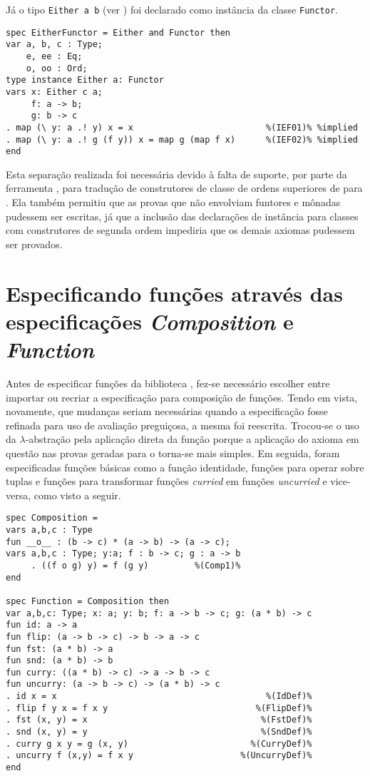 Já o tipo \Verb.Either a b. (ver ) foi declarado como instância da classe \Verb.Functor..

\begin{Verbatim}
spec EitherFunctor = Either and Functor then
var a, b, c : Type;
    e, ee : Eq;
    o, oo : Ord;
type instance Either a: Functor
vars x: Either c a;  
     f: a -> b;
     g: b -> c
. map (\ y: a .! y) x = x                          %(IEF01)% %implied
. map (\ y: a .! g (f y)) x = map g (map f x)      %(IEF02)% %implied
end
\end{Verbatim}

Esta separação realizada foi necessária devido à falta de suporte, por parte da ferramenta \Hets, para tradução de construtores de classe de ordens superiores de \HasCASL para \HOL.
Ela também permitiu que as provas que não envolviam funtores e mônadas pudessem ser escritas, já que a inclusão das declarações de instância para classes com construtores de segunda ordem impediria que os demais axiomas pudessem ser provados.

\section{Especificando funções através das especificações \textit{Composition} e \textit{Function}}
Antes de especificar funções da biblioteca \Prelude, fez-se necessário escolher entre importar ou recriar a especificação para composição de funções.
Tendo em vista, novamente, que mudanças seriam necessárias quando a especificação fosse refinada para uso de avaliação preguiçosa, a mesma foi reescrita.
Trocou-se o uso da $\lambda$-abstração pela aplicação direta da função porque a aplicação do axioma em questão nas provas geradas para o \Isabelle torna-se mais simples.
Em seguida, foram especificadas funções básicas como a função identidade, funções para operar sobre tuplas e funções para transformar funções \textit{curried} em funções \textit{uncurried} e vice-versa, como visto a seguir.

\begin{Verbatim}
spec Composition =
vars a,b,c : Type
fun __o__ : (b -> c) * (a -> b) -> (a -> c);
vars a,b,c : Type; y:a; f : b -> c; g : a -> b
     . ((f o g) y) = f (g y)         %(Comp1)%
end

spec Function = Composition then
var a,b,c: Type; x: a; y: b; f: a -> b -> c; g: (a * b) -> c
fun id: a -> a
fun flip: (a -> b -> c) -> b -> a -> c
fun fst: (a * b) -> a
fun snd: (a * b) -> b
fun curry: ((a * b) -> c) -> a -> b -> c
fun uncurry: (a -> b -> c) -> (a * b) -> c
. id x = x                                         %(IdDef)%
. flip f y x = f x y                             %(FlipDef)%
. fst (x, y) = x                                  %(FstDef)%
. snd (x, y) = y                                  %(SndDef)%
. curry g x y = g (x, y)                        %(CurryDef)%
. uncurry f (x,y) = f x y                     %(UncurryDef)%
end
\end{Verbatim}

